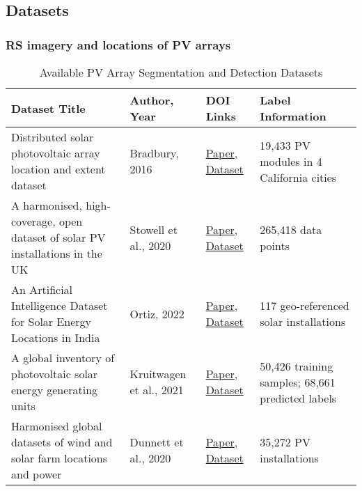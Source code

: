 \begin{multicols}{2}


\subsection{Datasets}
\subsubsection{RS imagery and locations of PV arrays}
    \begin{table}[htbp]
        \centering
        \scriptsize
        \caption{Available PV Array Segmentation and Detection Datasets}
        \begin{tabularx}{\columnwidth}{|l|l|X|l|}
            \hline
            \textbf{Dataset Title} & \textbf{Author, Year} & \textbf{DOI Links} & \textbf{Label Information} \\
            \hline
            Distributed solar photovoltaic array location and extent dataset & Bradbury, 2016 & \href{https://doi.org/10.1038/sdata.2016.106}{Paper}, \href{https://doi.org/10.6084/m9.figshare.3385780.v4}{Dataset} & 19,433 PV modules in 4 California cities \\
            \hline
            A harmonised, high-coverage, open dataset of solar PV installations in the UK & Stowell et al., 2020 & \href{https://doi.org/10.1038/s41597-020-00739-0}{Paper}, \href{https://zenodo.org/records/4059881}{Dataset} & 265,418 data points \\
            \hline
            An Artificial Intelligence Dataset for Solar Energy Locations in India & Ortiz, 2022 & \href{https://doi.org/10.1038/s41597-022-01499-9}{Paper}, \href{https://github.com/microsoft/solar-farms-mapping/blob/main/data/solar_farms_india_2021_merged_simplified.geojson}{Dataset} & 117 geo-referenced solar installations \\
            \hline
            A global inventory of photovoltaic solar energy generating units & Kruitwagen et al., 2021 & \href{https://doi.org/10.1038/s41586-021-03957-7}{Paper}, \href{https://doi.org/10.5281/zenodo.5005867}{Dataset} & 50,426 training samples; 68,661 predicted labels \\
            \hline
            Harmonised global datasets of wind and solar farm locations and power & Dunnett et al., 2020 & \href{https://doi.org/10.1038/s41597-020-0469-8}{Paper}, \href{https://doi.org/10.6084/m9.figshare.11310269.v6}{Dataset} & 35,272 PV installations \\

\end{tabularx}
\end{table}
\end{multicols}

